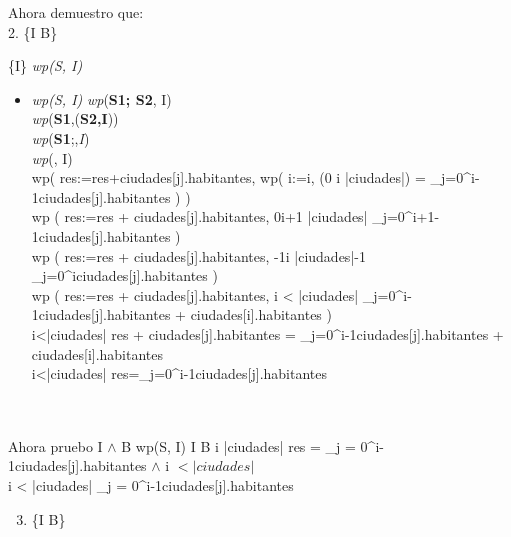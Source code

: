 \documentclass[10pt,a4paper]{article}
\begin{document}
Ahora demuestro que:\\
\vspace{0.3cm}
2.  {\{I \land B\}}  {\{{I}\}  \implica \textit{wp(S, I)}

\begin{itemize}
	\item 
	\textit{wp(S, I)}
	\equiv \textit{wp}(\textbf{S1; S2}, I)  \\
	\equiv \textit{wp}(\textbf{S1},(\textbf{S2,I}))  \\
	\equiv \textit{wp}(\textbf{S1};\;\;,\textit{I}) \\
	\equiv \textit{wp}(, I) \\
	\equiv wp\left( res:=res+ciudades[j].habitantes, wp\left( i:=i, (0 \leq i \leq |ciudades|) \land {} = \sum\limits_{j=0}^{i-1}ciudades[j].habitantes \right) \right) \\
	\equiv wp \left( res:=res + ciudades[j].habitantes, 0\leq i+1 \leq |ciudades| \wedge \sum\limits_{j=0}^{i+1-1}ciudades[j].habitantes \right) \\
	\equiv wp \left( res:=res + ciudades[j].habitantes, -1\leq i \leq |ciudades|-1 \wedge \sum\limits_{j=0}^{i}ciudades[j].habitantes \right)\\
	\equiv wp \left( res:=res + ciudades[j].habitantes, i < |ciudades| \wedge \sum\limits_{j=0}^{i-1}ciudades[j].habitantes + ciudades[i].habitantes \right)\\
	\equiv i<|ciudades| \wedge res + ciudades[j].habitantes = \sum\limits_{j=0}^{i-1}ciudades[j].habitantes + ciudades[i].habitantes \\
	\equiv i<|ciudades| \wedge res=\sum\limits_{j=0}^{i-1}ciudades[j].habitantes
\end{itemize}
\\ \\Ahora pruebo {I $\wedge$ B} \implica wp(S, I)
I \wedge B  \leq i \leq |ciudades| \wedge res = \sum\limits_{j = 0}^{i-1}ciudades[j].habitantes
$\wedge$ i $< |ciudades|$ \\ \equiv i < |ciudades| \wedge \sum\limits_{j = 0}^{i-1}ciudades[j].habitantes


\begin{enumerate}
	\setcounter{enumi}{2}  %
	\item {\{I \land  \neg B\}} \implica{}
	
\end{enumerate}

}
\end{document}

